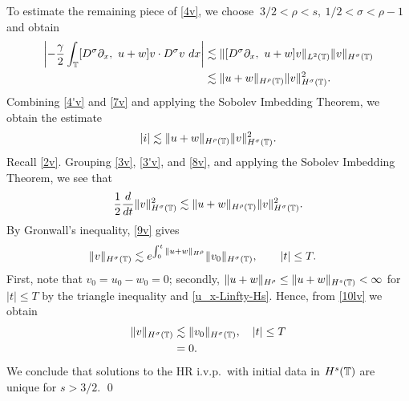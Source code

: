 To estimate the remaining piece of \eqref{4v}, we choose $\ 3/2 < \rho
< s,  \ 1/2< \sigma <\rho -1$ and obtain
\begin{equation}
\begin{split}
\left | -\frac{\gamma}{2} \int_{\mathbb{T}} [D^\sigma \partial_x, \ u+w] v
\cdot D^\sigma v \ dx \right |
& \lesssim \|[D^\sigma \partial_x, \ u+w]v\|_{L^2(\mathbb{T})}
\|v\|_{H^\sigma(\mathbb{T})} \\
& \lesssim \|u+w\|_{H^\rho(\mathbb{T})} \|v\|_{H^\sigma(\mathbb{T})}^2.
\label{7v}
\end{split}
\end{equation}
Combining \eqref{4'v} and \eqref{7v} and applying the Sobolev Imbedding
Theorem, we obtain the estimate
\begin{equation}
\begin{split}
|i| \lesssim \|u+w\|_{H^\rho(\mathbb{T})} \|v\|_{H^\sigma(\mathbb{T})}^2.
\label{8v}
\end{split}
\end{equation}
Recall \eqref{2v}. Grouping \eqref{3v}, \eqref{3'v}, and \eqref{8v}, and applying
the Sobolev Imbedding Theorem, we see that 
\begin{equation}
\begin{split}
\frac{1}{2} \frac{d}{dt}
\|v\|_{H^\sigma(\mathbb{T})}^2 \lesssim \|u+w\|_{H^\rho(\mathbb{T})}
\|v\|_{H^\sigma(\mathbb{T})}^2.
\label{9v}
\end{split}
\end{equation}
By Gronwall's inequality, \eqref{9v} gives
\begin{equation}
\label{10lv}
\begin{split}
\|v\|_{H^\sigma(\mathbb{T})}
& \lesssim e^{\int_0^t \|u+w\|_{H^{\rho}}}
\|v_0\|_{H^\sigma(\mathbb{T})}, \qquad |t| \le T.
\end{split}
\end{equation}
First, note that $v_0 = u_0 - w_0 = 0$; secondly, $\|u + w \|_{H^\rho}
\le \|u + w \|_{H^s(\mathbb{T})} < \infty$ for $|t| \le T$ by
the triangle inequality and \eqref{u_x-Linfty-Hs}. Hence, from
\eqref{10lv} we obtain
\begin{equation*}
\begin{split}
\|v\|_{H^\sigma(\mathbb{T})}
& \lesssim \|v_0\|_{H^\sigma(\mathbb{T})}, \quad |t| \le T	
\\
& = 0.
\end{split}
\end{equation*}
We conclude that solutions to the HR i.v.p.\ with initial data in
$H^s(\mathbb{T})$ are unique for $s > 3/2$.  \qed
%
%
%
%
